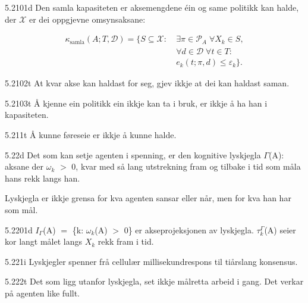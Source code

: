 \begin{formproposition}{5.2101}{d}
Den samla kapasiteten er aksemengdene éin og same politikk kan halde, der \(\mathcal X\) er dei oppgjevne omsynsaksane:

\[
\begin{aligned}
\kappa_{\mathrm{samla}}(A;T,\mathcal D)=\{S\subseteq\mathcal X:\ &\exists\pi\in\mathcal P_A\;\forall X_k\in S,\\
&\forall d\in\mathcal D\;\forall t\in T:\\
&e_k(t;\pi,d)\leq\varepsilon_k\}.
\end{aligned}
\]
\end{formproposition}

\begin{formproposition}{5.2102}{t}
At kvar akse kan haldast for seg, gjev ikkje at dei kan haldast saman.
\end{formproposition}

\begin{formproposition}{5.2103}{t}
Å kjenne ein politikk ein ikkje kan ta i bruk, er ikkje å ha han i kapasiteten.
\end{formproposition}

\begin{formproposition}{5.211}{t}
Å kunne føreseie er ikkje å kunne halde.
\end{formproposition}

\begin{formproposition}{5.22}{d}
Det som kan setje agenten i spenning, er den kognitive lyskjegla \(Γ\)(A): aksane der \(ω_{k}\) \(>\) 0, kvar med så lang utstrekning fram og tilbake i tid som måla hans rekk langs han.

Lyskjegla er ikkje grensa for kva agenten sansar eller når, men for kva han har som mål.
\end{formproposition}

\begin{formproposition}{5.2201}{d}
\(I_{Γ}\)(A) \(=\) \{k: \(ω_{k}\)(A) \(>\) 0\} er akseprojeksjonen av lyskjegla. \(τ^{Γ}_{k}\)(A) seier kor langt målet langs \(X_{k}\) rekk fram i tid.
\end{formproposition}

\begin{formproposition}{5.221}{i}
Lyskjegler spenner frå cellulær millisekundrespons til tiårslang konsensus.
\end{formproposition}

\begin{formproposition}{5.222}{t}
Det som ligg utanfor lyskjegla, set ikkje målretta arbeid i gang. Det verkar på agenten like fullt.
\end{formproposition}

